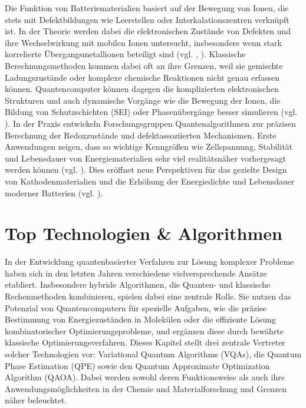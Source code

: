 Die Funktion von Batteriematerialien basiert auf der Bewegung von Ionen, die stets mit Defektbildungen wie Leerstellen oder Interkalationszentren verknüpft ist. In der Theorie werden dabei die elektronischen Zustände von Defekten und ihre Wechselwirkung mit mobilen Ionen untersucht, insbesondere wenn stark korrelierte Übergangsmetallionen beteiligt sind (vgl. \cite{hanaor_computational_2024}, \cite{freysoldt_first-principles_2014}). Klassische Berechnungsmethoden kommen dabei oft an ihre Grenzen, weil sie gemischte Ladungszustände oder komplexe chemische Reaktionen nicht genau erfassen können. Quantencomputer können dagegen die komplizierten elektronischen Strukturen und auch dynamische Vorgänge wie die Bewegung der Ionen, die Bildung von Schutzschichten (SEI) oder Phasenübergänge besser simulieren (vgl. \cite{urban_computational_2016}).
In der Praxis entwickeln Forschungsgruppen Quantenalgorithmen zur präzisen Berechnung der Redoxzustände und defektassoziierten Mechanismen. Erste Anwendungen zeigen, dass so wichtige Kenngrößen wie Zellspannung, Stabilität und Lebensdauer von Energiematerialien sehr viel realitätsnäher vorhergesagt werden können (vgl. \cite{baker_simulating_2024}). Dies eröffnet neue Perspektiven für das gezielte Design von Kathodenmaterialien und die Erhöhung der Energiedichte und Lebensdauer moderner Batterien (vgl. \cite{hanaor_computational_2024}).



\section{Top Technologien \& Algorithmen}
In der Entwicklung quantenbasierter Verfahren zur Lösung komplexer Probleme haben sich in den letzten Jahren verschiedene vielversprechende Ansätze etabliert. Insbesondere hybride Algorithmen, die Quanten- und klassische Rechenmethoden kombinieren, spielen dabei eine zentrale Rolle. Sie nutzen das Potenzial von Quantencomputern für spezielle Aufgaben, wie die präzise Bestimmung von Energiezuständen in Molekülen oder die effiziente Lösung kombinatorischer Optimierungsprobleme, und ergänzen diese durch bewährte klassische Optimierungsverfahren.
\vspace{1em}
Dieses Kapitel stellt drei zentrale Vertreter solcher Technologien vor: Variational Quantum Algorithms (VQAs), die Quantum Phase Estimation (QPE) sowie den Quantum Approximate Optimization Algorithm (QAOA). Dabei werden sowohl deren Funktionsweise als auch ihre Anwendungsmöglichkeiten in der Chemie und Materialforschung und Grenzen näher beleuchtet.




